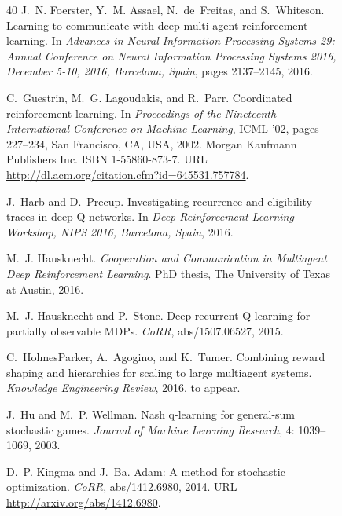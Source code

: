 \documentclass{article}
\begin{document}
\begin{figure}
\begin{thebibliography}{40}
J.~N. Foerster, Y.~M. Assael, N.~de~Freitas, and S.~Whiteson.
\newblock Learning to communicate with deep multi-agent reinforcement learning.
\newblock In \emph{Advances in Neural Information Processing Systems 29: Annual
  Conference on Neural Information Processing Systems 2016, December 5-10,
  2016, Barcelona, Spain}, pages 2137--2145, 2016.

C.~Guestrin, M.~G. Lagoudakis, and R.~Parr.
\newblock Coordinated reinforcement learning.
\newblock In \emph{Proceedings of the Nineteenth International Conference on
  Machine Learning}, ICML '02, pages 227--234, San Francisco, CA, USA, 2002.
  Morgan Kaufmann Publishers Inc.
\newblock ISBN 1-55860-873-7.
\newblock URL \url{http://dl.acm.org/citation.cfm?id=645531.757784}.

J.~Harb and D.~Precup.
\newblock Investigating recurrence and eligibility traces in deep {Q-}networks.
\newblock In \emph{Deep Reinforcement Learning Workshop, NIPS 2016, Barcelona,
  Spain}, 2016.

M.~J. Hausknecht.
\newblock \emph{Cooperation and Communication in Multiagent Deep Reinforcement
  Learning}.
\newblock PhD thesis, The University of Texas at Austin, 2016.

M.~J. Hausknecht and P.~Stone.
\newblock Deep recurrent {Q}-learning for partially observable {MDPs}.
\newblock \emph{CoRR}, abs/1507.06527, 2015.

C.~HolmesParker, A.~Agogino, and K.~Tumer.
\newblock Combining reward shaping and hierarchies for scaling to large
  multiagent systems.
\newblock \emph{Knowledge Engineering Review}, 2016.
\newblock to appear.

J.~Hu and M.~P. Wellman.
\newblock Nash q-learning for general-sum stochastic games.
\newblock \emph{Journal of Machine Learning Research}, 4: 1039--1069,
  2003.

D.~P. Kingma and J.~Ba.
\newblock Adam: {A} method for stochastic optimization.
\newblock \emph{CoRR}, abs/1412.6980, 2014.
\newblock URL \url{http://arxiv.org/abs/1412.6980}.


\end{thebibliography}
\end{figure}
\end{document}
